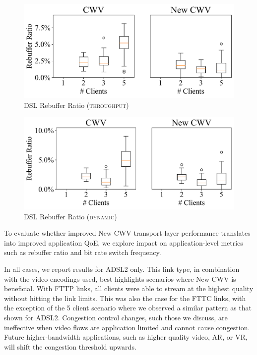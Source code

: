 \documentclass[10pt,sigconf]{acmart}
\begin{document}
\begin{figure}
    \includegraphics[width=.45\textwidth, keepaspectratio]{figures/Rebuffer_Ratio.pdf}
    \caption{DSL Rebuffer Ratio (\textsc{throughput})}
    \label{fig:rebuffer-ratio}
\end{figure}

\begin{figure}
    \includegraphics[width=.45\textwidth, keepaspectratio]{figures/Rebuffer_Ratio_dynamic.pdf}
    \caption{DSL Rebuffer Ratio (\textsc{dynamic})}
    \label{fig:rebuffer-ratio-dynamic}
\end{figure}

To evaluate whether improved New CWV transport layer performance translates into improved application QoE, we explore impact on application-level metrics such as rebuffer ratio and bit rate switch frequency. 

In all cases, we report results for ADSL2 only. This link type, in combination with the video encodings used, best highlights scenarios where New CWV is beneficial. With FTTP links, all clients were able to stream at the highest quality without hitting the link limits. This was also the case for the FTTC links, with the exception of the 5 client scenario where we observed a similar pattern as that shown for ADSL2. Congestion control changes, such those we discuss, are ineffective when video flows are application limited and cannot cause congestion. Future higher-bandwidth applications, such as higher quality video, AR, or VR, will shift the congestion threshold upwards.
\end{document}
